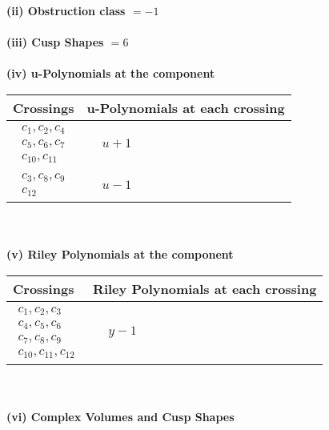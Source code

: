 \documentclass[1p]{elsarticle_modified}
\theoremstyle{definition}
\begin{document}
\flushleft \textbf{(ii) Obstruction class $= -1$}\\~\\
\flushleft \textbf{(iii) Cusp Shapes $= 6$}\\~\\
\newpage\renewcommand{\arraystretch}{1}
\flushleft \textbf{(iv) u-Polynomials at the component}\newline \\
\begin{tabular}{m{50pt}|m{274pt}}
Crossings & \hspace{64pt}u-Polynomials at each crossing \\
\hline $$\begin{aligned}c_{1},c_{2},c_{4}\\c_{5},c_{6},c_{7}\\c_{10},c_{11}\end{aligned}$$&$\begin{aligned}
&u+1
\end{aligned}$\\
\hline $$\begin{aligned}c_{3},c_{8},c_{9}\\c_{12}\end{aligned}$$&$\begin{aligned}
&u-1
\end{aligned}$\\
\hline
\end{tabular}\\~\\
\newpage\renewcommand{\arraystretch}{1}
\flushleft \textbf{(v) Riley Polynomials at the component}\newline \\
\begin{tabular}{m{50pt}|m{274pt}}
Crossings & \hspace{64pt}Riley Polynomials at each crossing \\
\hline $$\begin{aligned}c_{1},c_{2},c_{3}\\c_{4},c_{5},c_{6}\\c_{7},c_{8},c_{9}\\c_{10},c_{11},c_{12}\end{aligned}$$&$\begin{aligned}
&y-1
\end{aligned}$\\
\hline
\end{tabular}\\~\\
\newpage\flushleft \textbf{(vi) Complex Volumes and Cusp Shapes}
\end{document}
